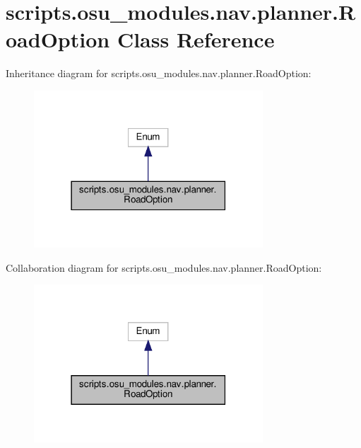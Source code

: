 \hypertarget{classscripts_1_1osu__modules_1_1nav_1_1planner_1_1RoadOption}{}\section{scripts.\+osu\+\_\+modules.\+nav.\+planner.\+Road\+Option Class Reference}
\label{classscripts_1_1osu__modules_1_1nav_1_1planner_1_1RoadOption}


Inheritance diagram for scripts.\+osu\+\_\+modules.\+nav.\+planner.\+Road\+Option\+:\nopagebreak
\begin{figure}[H]
\begin{center}
\leavevmode
\includegraphics[width=243pt]{dc/df1/classscripts_1_1osu__modules_1_1nav_1_1planner_1_1RoadOption__inherit__graph}
\end{center}
\end{figure}


Collaboration diagram for scripts.\+osu\+\_\+modules.\+nav.\+planner.\+Road\+Option\+:\nopagebreak
\begin{figure}[H]
\begin{center}
\leavevmode
\includegraphics[width=243pt]{de/d65/classscripts_1_1osu__modules_1_1nav_1_1planner_1_1RoadOption__coll__graph}
\end{center}
\end{figure}
